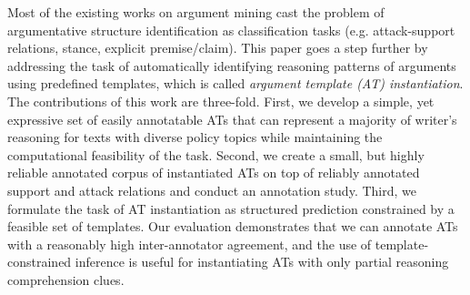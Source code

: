 Most of the existing works on argument mining cast the problem of argumentative structure identification as classification tasks (e.g. attack-support relations, stance, explicit premise/claim). This paper goes a step further by addressing the task of automatically identifying reasoning patterns of arguments using predefined templates, which is called \emph{argument template (AT) instantiation}. The contributions of this work are three-fold. First, we develop a simple, yet expressive set of easily annotatable ATs that can represent a majority of writer's reasoning for texts with diverse policy topics while maintaining the computational feasibility of the task. Second, we create a small, but highly reliable annotated corpus of instantiated ATs on top of reliably annotated support and attack relations and conduct an annotation study. Third, we formulate the task of AT instantiation as structured prediction constrained by a feasible set of templates. Our evaluation demonstrates that we can annotate ATs with a reasonably high inter-annotator agreement, and the use of template-constrained inference is useful for instantiating ATs with only partial reasoning comprehension clues.
